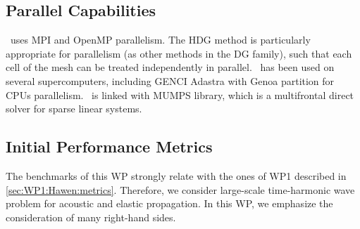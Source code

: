\subsection{Parallel Capabilities}
\label{sec:WP3:Hawen:performances}

\hawen~uses MPI and OpenMP parallelism. The HDG method is particularly 
appropriate for parallelism (as other methods in the DG family), such 
that each cell of the mesh can be treated independently in parallel. 
\hawen~has been used on several supercomputers, including GENCI Adastra
with Genoa partition for CPUs parallelism.
\hawen~is linked with MUMPS library, which is a multifrontal direct solver 
for sparse linear systems. 




\subsection{Initial Performance Metrics}
\label{sec:WP3:Hawen:metrics}


The benchmarks of this WP strongly relate with the 
ones of WP1 described in \cref{sec:WP1:Hawen:metrics}.
Therefore, we consider large-scale time-harmonic wave 
problem for acoustic and elastic propagation.
In this WP, we emphasize the consideration of many 
right-hand sides.


